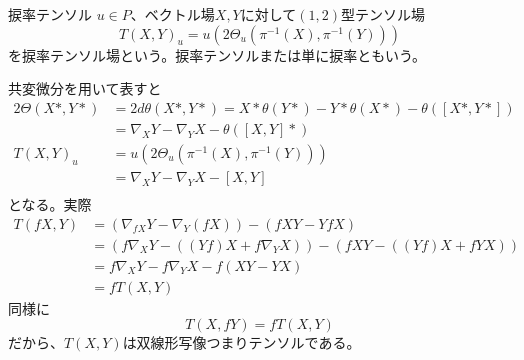 	\begin{dfn}{捩率テンソル}
		$u \in P$、ベクトル場$X, Y$に対して$(1, 2)$型テンソル場
			\[T(X, Y)_u = u(2\Theta_u(\pi^{-1}(X), \pi^{-1}(Y)))\]
		を捩率テンソル場という。捩率テンソルまたは単に捩率ともいう。
	\end{dfn}
	共変微分を用いて表すと
	\begin{align*}
		2\Theta(X*, Y*)
		&= 2d\theta(X*, Y*) = X*\theta(Y*) - Y*\theta(X*) - \theta([X*, Y*])\\
		&= \nabla_XY - \nabla_YX - \theta([X, Y]*)\\
		T(X, Y)_u
		&= u(2\Theta_u(\pi^{-1}(X), \pi^{-1}(Y)))\\
		&= \nabla_XY - \nabla_YX - [X, Y]\\
	\end{align*}
	となる。実際
	\begin{align*}
		T(fX, Y) &= (\nabla_{fX}Y - \nabla_Y(fX)) - (fXY - YfX)\\
		&= (f\nabla_XY - ((Yf)X + f\nabla_YX)) - (fXY - ((Yf)X + fYX))\\
		&= f\nabla_XY - f\nabla_YX - f(XY - YX)\\
		&= fT(X, Y)
	\end{align*}
	同様に
		\[T(X, fY) = fT(X, Y)\]
	だから、$T(X, Y)$は双線形写像つまりテンソルである。


